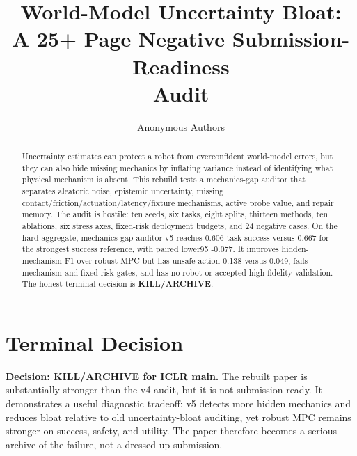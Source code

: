 \documentclass{article}
\title{World-Model Uncertainty Bloat:\\A 25+ Page Negative Submission-Readiness\\Audit}
\author{Anonymous Authors}
\newcommand{\methodname}{mechanics gap auditor v5}
\begin{document}
\maketitle

\begin{abstract}

Uncertainty estimates can protect a robot from overconfident world-model errors, but they can also hide missing mechanics by inflating variance instead of identifying what physical mechanism is absent. This rebuild tests a mechanics-gap auditor that separates aleatoric noise, epistemic uncertainty, missing contact/friction/actuation/latency/fixture mechanisms, active probe value, and repair memory. The audit is hostile: ten seeds, six tasks, eight splits, thirteen methods, ten ablations, six stress axes, fixed-risk deployment budgets, and 24 negative cases. On the hard aggregate, \methodname{} reaches 0.606 task success versus 0.667 for the strongest success reference, with paired lower95 -0.077. It improves hidden-mechanism F1 over robust MPC but has unsafe action 0.138 versus 0.049, fails mechanism and fixed-risk gates, and has no robot or accepted high-fidelity validation. The honest terminal decision is \textbf{KILL/ARCHIVE}.

\end{abstract}

\section{Terminal Decision}

\textbf{Decision: KILL/ARCHIVE for ICLR main.} The rebuilt paper is substantially stronger than the v4 audit, but it is not submission ready. It demonstrates a useful diagnostic tradeoff: v5 detects more hidden mechanics and reduces bloat relative to old uncertainty-bloat auditing, yet robust MPC remains stronger on success, safety, and utility. The paper therefore becomes a serious archive of the failure, not a dressed-up submission.
\end{document}
